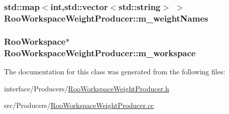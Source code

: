 \hypertarget{classRooWorkspaceWeightProducer_a2e44c1348d34ed37d73fd5cad356f28a}{
\subsubsection[{m\_\-weightNames}]{\setlength{\rightskip}{0pt plus 5cm}std::map$<$int,std::vector$<$std::string$>$ $>$ {\bf RooWorkspaceWeightProducer::m\_\-weightNames}}}
\label{classRooWorkspaceWeightProducer_a2e44c1348d34ed37d73fd5cad356f28a}
\hypertarget{classRooWorkspaceWeightProducer_add3a4f23764c43521473e942b8231d85}{
\subsubsection[{m\_\-workspace}]{\setlength{\rightskip}{0pt plus 5cm}RooWorkspace$\ast$ {\bf RooWorkspaceWeightProducer::m\_\-workspace}}}
\label{classRooWorkspaceWeightProducer_add3a4f23764c43521473e942b8231d85}


The documentation for this class was generated from the following files:\begin{DoxyCompactItemize}
\item 
interface/Producers/\hyperlink{RooWorkspaceWeightProducer_8h}{RooWorkspaceWeightProducer.h}\item 
src/Producers/\hyperlink{RooWorkspaceWeightProducer_8cc}{RooWorkspaceWeightProducer.cc}\end{DoxyCompactItemize}
